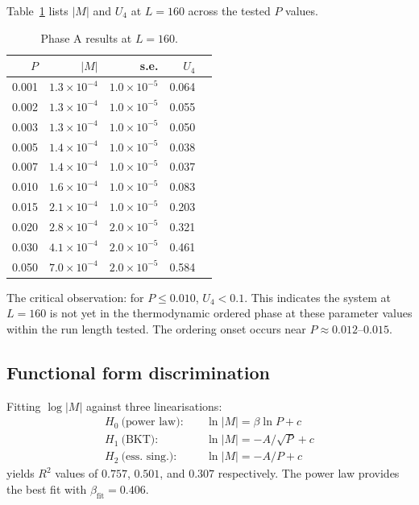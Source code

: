 \documentclass[twocolumn,10pt]{article}
\begin{document}
Table~\ref{tab:phaseA} lists $|M|$ and $U_4$ at $L=160$ across the tested $P$ values.

\begin{table}[h]
\centering
\caption{Phase A results at $L=160$.}
\label{tab:phaseA}
\begin{tabular}{rrrrr}
\toprule
$P$ & $|M|$ & s.e. & $U_4$ \\
\midrule
0.001 & $1.3\times10^{-4}$ & $1.0\times10^{-5}$ & 0.064 \\
0.002 & $1.3\times10^{-4}$ & $1.0\times10^{-5}$ & 0.055 \\
0.003 & $1.3\times10^{-4}$ & $1.0\times10^{-5}$ & 0.050 \\
0.005 & $1.4\times10^{-4}$ & $1.0\times10^{-5}$ & 0.038 \\
0.007 & $1.4\times10^{-4}$ & $1.0\times10^{-5}$ & 0.037 \\
0.010 & $1.6\times10^{-4}$ & $1.0\times10^{-5}$ & 0.083 \\
0.015 & $2.1\times10^{-4}$ & $1.0\times10^{-5}$ & 0.203 \\
0.020 & $2.8\times10^{-4}$ & $2.0\times10^{-5}$ & 0.321 \\
0.030 & $4.1\times10^{-4}$ & $2.0\times10^{-5}$ & 0.461 \\
0.050 & $7.0\times10^{-4}$ & $2.0\times10^{-5}$ & 0.584 \\
\bottomrule
\end{tabular}
\end{table}

The critical observation: for $P \leq 0.010$, $U_4 < 0.1$.
This indicates the system at $L=160$ is not yet in the thermodynamic ordered phase
at these parameter values within the run length tested.
The ordering onset occurs near $P \approx 0.012$--$0.015$.

\subsection{Functional form discrimination}

Fitting $\log|M|$ against three linearisations:
\begin{align*}
  H_0\ \text{(power law)}:&\quad \ln|M| = \beta\ln P + c \\
  H_1\ \text{(BKT)}:&\quad \ln|M| = -A/\sqrt{P} + c \\
  H_2\ \text{(ess. sing.)}:&\quad \ln|M| = -A/P + c
\end{align*}
yields $R^2$ values of $0.757$, $0.501$, and $0.307$ respectively.
The power law provides the best fit with $\beta_\mathrm{fit} = 0.406$.
\end{document}
